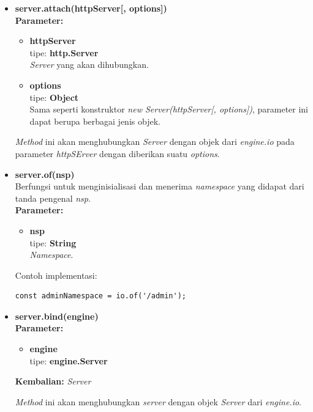 \documentclass[a4paper,twoside]{article}
\begin{document}
\begin{enumerate}
\begin{enumerate}
\begin{enumerate}
\begin{itemize}
					\item \textbf{server.attach(httpServer[, options])} \\
					\textbf{Parameter:} 
					\begin{itemize}
						\item \textbf{httpServer} \\tipe: \textbf{http.Server} \\ \textit{Server} yang akan dihubungkan.
						\item \textbf{options} \\tipe: \textbf{Object} \\ Sama seperti konstruktor \textit{new Server(httpServer[, options])}, parameter ini dapat berupa berbagai jenis objek.
					\end{itemize}
					\textit{Method} ini akan menghubungkan \textit{Server} dengan objek dari \textit{engine.io} pada parameter \textit{httpSErver} dengan diberikan suatu \textit{options}.
					
					\item \textbf{server.of(nsp)} \\
					Berfungsi untuk menginisialisasi dan menerima \textit{namespace} yang didapat dari tanda pengenal \textit{nsp}. \\
					\textbf{Parameter:}
					\begin{itemize}
						\item \textbf{nsp} \\tipe: \textbf{String} \\ \textit{Namespace}.
					\end{itemize}
					Contoh implementasi:
\begin{lstlisting}
const adminNamespace = io.of('/admin');
\end{lstlisting}
					
					\item \textbf{server.bind(engine)} \\
					\textbf{Parameter:}
					\begin{itemize}
						\item \textbf{engine} \\tipe: \textbf{engine.Server}
					\end{itemize}
					\textbf{Kembalian:} \textit{Server}
					
					\textit{Method} ini akan menghubungkan \textit{server} dengan objek \textit{Server} dari \textit{engine.io}.
					

\end{itemize}
\end{enumerate}
\end{enumerate}
\end{enumerate}
\end{document}
